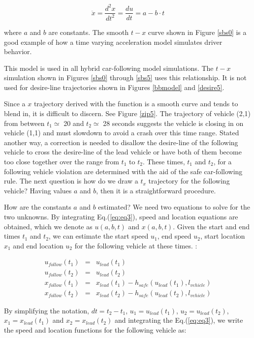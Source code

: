 \documentclass[Proceedings]{ascelike}
\begin{document}
\begin {equation}
 \ddot{x} = \frac{d^2x}{dt^2} = \frac{du}{dt} =  a - b \cdot t \label{eq:eq3}
\end{equation}

\noindent where $a$ and $b$ are constants.  The smooth $t-x$ curve shown in Figure \ref{sbs0} is a good example of how a time varying acceleration model simulates driver behavior. 


This model is used in all hybrid car-following model simulations. The $t-x$ simulation shown in Figures \ref{sbs0} through \ref{sbs5} uses this relationship. It is not used for desire-line trajectories shown in Figures \ref{bbmodel} and \ref{desire5}. 

Since a $x$ trajectory derived with the function is a smooth curve and tends to blend in, it is difficult to discern.  See Figure \ref{zip5}. The trajectory of vehicle (2,1) from between $t_1 \simeq$ 20 and $t_2 \simeq$ 28 seconds suggests the vehicle is closing in on vehicle (1,1) and must slowdown to avoid a crash over this time range. Stated another way, a correction is needed to disallow the desire-line of the following vehicle to cross the desire-line of the lead vehicle or have both of them become too close together over the range from  $t_1$ to $t_2$. These times, $t_1$ and $t_2$, for a following vehicle violation are determined with the aid of the safe car-following rule. The next question is how do we draw a $t_x$ trajectory for the following vehicle?  Having values $a$ and $b$, then it is a straightforward procedure. 

How  are the constants $a$ and $b$ estimated? We need two equations to solve for the two unknowns. By integrating Eq.(\ref{eq:eq3}), speed and location equations are obtained, which we denote as $u(a,b,t)$ and $x(a,b,t)$. Given the start and end times $t_1$ and $t_2$, we can estimate the start speed $u_1$, end speed $u_2$, start location $x_1$ and end location $u_2$ for the following vehicle at these times. :

\begin{eqnarray} 
u_{follow}(t_1) &=& u_{lead}(t_1) \\
u_{follow}(t_2) &=& u_{lead}(t_2) \\
x_{follow}(t_1) &=& x_{lead}(t_1) - h_{safe}(u_{lead}(t_1), l_{vehicle}) \\
x_{follow}(t_2) &=& x_{lead}(t_2) - h_{safe}(u_{lead}(t_2), l_{vehicle})  
\end{eqnarray}

\noindent By simplifying  the notation, $dt = t_2 - t_1$, $u_1 = u_{lead}(t_1)$,  $u_2 = u_{lead}(t_2)$, $x_1 = x_{lead}(t_1)$ and $x_2 = x_{lead}(t_2)$ and integrating the Eq.(\ref{eq:eq3}), we write the speed and location functions for the following vehicle as:
\end{document}
